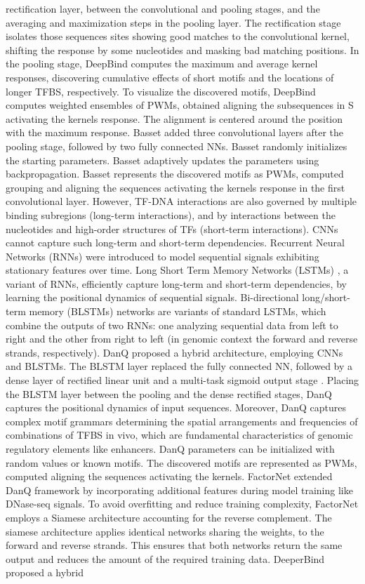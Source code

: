 \documentclass[a4paper, titlepage, openright]{book}
\begin{document}
rectification layer, between the convolutional and pooling stages, and the averaging and maximization steps in the pooling layer. The rectification stage isolates those sequences sites showing good matches to the convolutional kernel, shifting the response by some nucleotides and masking bad matching positions. In the pooling stage, DeepBind computes the maximum and average kernel responses, discovering cumulative effects of short motifs and the locations of longer TFBS, respectively. To visualize the discovered motifs, DeepBind computes weighted ensembles of PWMs, obtained aligning the subsequences in S activating the kernels response. The alignment is centered around the position with the maximum response. Basset \citep{kelley2016basset} added three convolutional layers after the pooling stage, followed by two fully connected NNs. Basset randomly initializes the starting parameters. Basset adaptively updates the parameters using backpropagation. Basset represents the discovered motifs as PWMs, computed grouping and aligning the sequences activating the kernels response in the first convolutional layer. However, TF-DNA interactions are also governed by multiple binding subregions (long-term interactions), and by interactions between the nucleotides and high-order structures of TFs (short-term interactions). CNNs cannot capture such long-term and short-term dependencies. Recurrent Neural Networks (RNNs) were introduced to model sequential signals exhibiting stationary features over time. Long Short Term Memory Networks (LSTMs) \citep{hochreiter1997long}, a variant of RNNs, efficiently capture long-term and short-term dependencies, by learning the positional dynamics of sequential signals. Bi-directional long/short-term memory (BLSTMs) networks are variants of standard LSTMs, which combine the outputs of two RNNs: one analyzing sequential data from left to right and the other from right to left (in genomic context the forward and reverse strands, respectively). DanQ \citep{quang2016danq} proposed a hybrid architecture, employing CNNs and BLSTMs. The BLSTM layer replaced the fully connected NN, followed by a dense layer of rectified linear unit and a multi-task sigmoid output stage \citep{quang2016danq}. Placing the BLSTM layer between the pooling and the dense rectified stages, DanQ captures the positional dynamics of input sequences. Moreover, DanQ captures complex motif grammars determining the spatial arrangements and frequencies of combinations of TFBS in vivo, which are fundamental characteristics of genomic regulatory elements like enhancers.  DanQ parameters can be initialized with random values or known motifs. The discovered motifs are represented as PWMs, computed aligning the sequences activating the kernels. FactorNet \citep{quang2019factornet} extended DanQ framework by incorporating additional features during model training like DNase-seq signals. To avoid overfitting and reduce training complexity, FactorNet employs a Siamese architecture accounting for the reverse complement. The siamese architecture applies identical networks sharing the weights, to the forward and reverse strands. This ensures that both networks return the same output and reduces the amount of the required training data. DeeperBind \citep{hassanzadeh2016deeperbind} proposed a hybrid 
\end{document}
